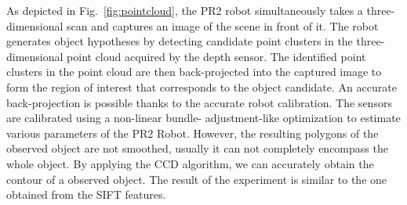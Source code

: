As depicted in Fig.~\ref{fig:pointcloud}, the PR2 robot simultaneously takes a three-dimensional scan and captures
an image of the scene in front of it. The robot generates
object hypotheses by detecting candidate point clusters in
the three-dimensional point cloud acquired by the depth sensor. %
The identified point clusters in the
point cloud are then back-projected into the captured image
to form the region of interest that corresponds to the object
candidate. An accurate back-projection is possible thanks to
the accurate robot calibration. The sensors are calibrated using a non-linear bundle-
adjustment-like optimization to estimate various parameters
of the PR2 Robot. However,
the resulting polygons of the observed object are not smoothed,
usually it can not completely encompass the whole object.
By applying the CCD algorithm, we can accurately obtain the contour of
a observed object. The result of the experiment is similar to the one
obtained from the SIFT features.
